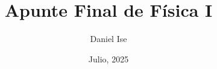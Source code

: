 \documentclass[11pt]{article}
\title{Apunte Final de Física I}
\author{Daniel Ise}
\date{Julio, 2025}
\begin{document}
\maketitle
\pagebreak

\tableofcontents
\pagebreak



\end{document}
